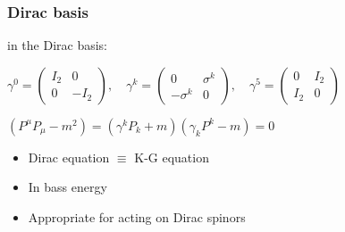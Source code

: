 \label{definition}
\begin{frame}[t]\frametitle{Dirac basis}

in the Dirac basis:\newline


\begin{center}
	$\gamma ^{0}={\begin{pmatrix}I_{2}&0\\0&-I_{2}\end{pmatrix}},\quad \gamma ^{k}={\begin{pmatrix}0&\sigma ^{k}\\-\sigma ^{k}&0\end{pmatrix}},\quad \gamma ^{5}={\begin{pmatrix}0&I_{2}\\I_{2}&0\end{pmatrix}}$
 
\end{center}
\newline
 \newline
\begin{center}
	 
$( P^\mu P_\mu - m^2 )=( \gamma^k P_k + m)(\gamma_k P^k  -m) = 0$ 
 
\end{center}
 
\begin{itemize}
	 \item Dirac equation $\equiv$ K-G equation
 \item In bass energy
  \item  Appropriate for acting on Dirac spinors
\end{itemize}

\end{frame}
